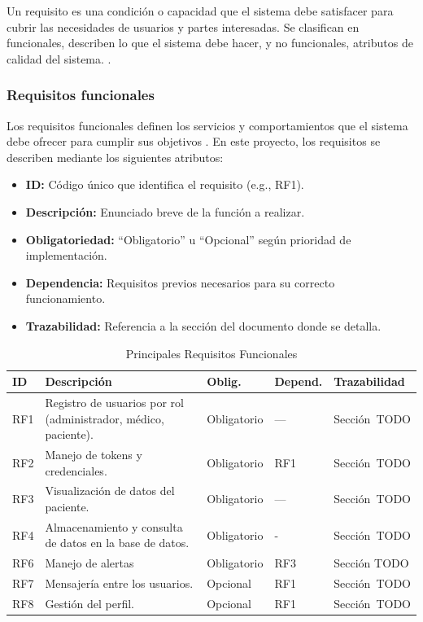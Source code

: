 \documentclass[12pt, a4paper]{article}
\begin{document}
		Un requisito es una condición o capacidad que el sistema debe satisfacer para cubrir las necesidades de usuarios y partes interesadas. Se clasifican en funcionales, describen lo que el sistema debe hacer, y no funcionales, atributos de calidad del sistema. \cite{sommerville}.
	
			\subsubsection{Requisitos funcionales}
			
			Los requisitos funcionales definen los servicios y comportamientos que el sistema debe ofrecer para cumplir sus objetivos \cite{ieee830}. En este proyecto, los requisitos se describen mediante los siguientes atributos:
			
			\begin{itemize}
				\item \textbf{ID:} Código único que identifica el requisito (e.g., RF1).
				\item \textbf{Descripción:} Enunciado breve de la función a realizar.
				\item \textbf{Obligatoriedad:} “Obligatorio” u “Opcional” según prioridad de implementación.
				\item \textbf{Dependencia:} Requisitos previos necesarios para su correcto funcionamiento.
				\item \textbf{Trazabilidad:} Referencia a la sección del documento donde se detalla.
			\end{itemize}

			
			\begin{table}[ht]
				\centering
				\caption{Principales Requisitos Funcionales}
				\begin{tabular}{|p{1.5cm}|p{6cm}|p{2cm}|p{2cm}|p{3cm}|}
					\hline
					\textbf{ID} & \textbf{Descripción} & \textbf{Oblig.} & \textbf{Depend.} & \textbf{Trazabilidad} \\
					\hline
					RF1 & Registro de usuarios por rol (administrador, médico, paciente). & Obligatorio & —   & Sección TODO \\
					\hline
					RF2 & Manejo de tokens y credenciales.                       & Obligatorio & RF1 & Sección TODO \\
					\hline
					RF3 & Visualización de datos del paciente. & Obligatorio & —   & Sección TODO \\
					\hline
					RF4 & Almacenamiento y consulta de datos en la base de datos.         & Obligatorio & - & Sección TODO \\
					\hline
					RF6 & Manejo de alertas             & Obligatorio & RF3 & Sección TODO \\
					\hline
					RF7 & Mensajería entre los usuarios.                              & Opcional   & RF1 & Sección TODO \\
					\hline
					RF8 & Gestión del perfil.               & Opcional & RF1 & Sección TODO \\
					\hline
				\end{tabular}
			\end{table}
	
\end{document}
